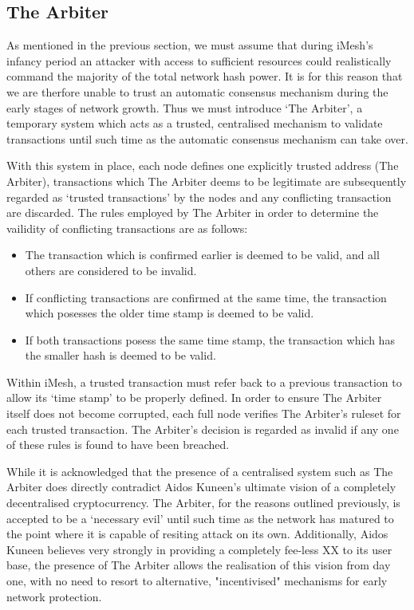 \documentclass[a4paper,10pt,twocolumn]{article}
\begin{document}
\subsection{The Arbiter}

As mentioned in the previous section, we must assume that during iMesh's infancy period an attacker with access to sufficient resources 
could realistically command the majority of the total network hash power. It is for this reason that we are therfore unable to trust an 
automatic consensus mechanism during the early stages of network growth. Thus we must introduce `The Arbiter', a temporary system which 
acts as a trusted, centralised mechanism to validate transactions until such time as the automatic consensus mechanism can take over.

With this system in place, each node defines one explicitly trusted address (The Arbiter), transactions which The Arbiter deems to be 
legitimate are subsequently regarded as `trusted transactions' by the nodes and any conflicting transaction are discarded. The rules 
employed by The Arbiter in order to determine the vailidity of conflicting transactions are as follows:

\begin{itemize}
	\item The transaction which is confirmed earlier is deemed to be valid, and all others are considered to be invalid.
	\item If conflicting transactions are confirmed at the same time, the transaction which posesses the older time stamp is deemed 
	to be valid.
	\item If both transactions posess the same time stamp, the transaction which has the smaller hash
	is deemed to be valid.
\end{itemize}

Within iMesh, a trusted transaction must refer back to a previous transaction to allow its `time stamp' to be properly defined.
In order to ensure The Arbiter itself does not become corrupted, each full node verifies The Arbiter's ruleset for each trusted 
transaction. The Arbiter's decision is regarded as invalid if any one of these rules is found to have been breached.

While it is acknowledged that the presence of a centralised system such as The Arbiter does directly contradict Aidos Kuneen's ultimate 
vision of a completely decentralised cryptocurrency. The Arbiter, for the reasons outlined previously, is accepted to be a
`necessary evil' until such time as the network has matured to the point where it is capable of resiting attack on its own. 
Additionally, Aidos Kuneen believes very strongly in providing a completely fee-less XX to its user base, the presence of The Arbiter 
allows the realisation of this vision from day one, with no need to resort to alternative, "incentivised" mechanisms for early network 
protection.
\end{document}
